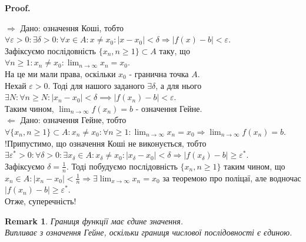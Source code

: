 \documentclass[a4paper, 14pt]{article}
\makeatletter
\def\qed{$\blacksquare$}
\def\rightproof{$\boxed{\Rightarrow}$ }
\def\leftproof{$\boxed{\Leftarrow}$ }
\theoremstyle{theoremdd}
\theoremstyle{theoremdd}
\theoremstyle{theoremdd}
\theoremstyle{theoremdd}
\theoremstyle{theoremdd}
\theoremstyle{theoremdd}
\newtheorem{remark}[theorem]{Remark}
\theoremstyle{theoremdd}
\theoremstyle{theoremdd}
\renewenvironment{proof}[1][Proof.\\]{\par
\pushQED{\hfill \qed}%
\normalfont \topsep6\p@\@plus6\p@\relax
\trivlist
\item\relax
{\bfseries
#1\@addpunct{.}}\hspace\labelsep\ignorespaces
}{%
\popQED\endtrivlist\@endpefalse
}
\makeatother
\begin{document}
	\begin{proof}
	\rightproof Дано: означення Коші, тобто\\
	$\forall \varepsilon > 0: \exists \delta > 0: \forall x \in A: x \neq x_0: |x-x_0|<\delta \Rightarrow |f(x)-b|<\varepsilon$.\\
	Зафіксуємо послідовність $\{x_n, n \geq 1\} \subset A$ таку, що $\forall n \geq 1: x_n \neq x_0: \displaystyle \lim_{n \to \infty} x_n = x_0$.\\
	На це ми мали права, оскільки $x_0$ - гранична точка $A$.\\
	Нехай $\varepsilon > 0$. Тоді для нашого заданого $\exists \delta$, а для нього $\exists N: \forall n \geq N: |x_n - x_0| < \delta \implies |f(x_n) - b| < \varepsilon$.\\
	Таким чином, $\displaystyle \lim_{n \to \infty} f(x_n) = b$ - означення Гейне.
	\bigskip \\
	\leftproof Дано: означення Гейне, тобто\\
	$\displaystyle \forall \{x_n, n \geq 1\}\subset A: x_n \neq x_0: \forall n \geq 1: \lim_{n \to \infty} x_n = x_0 \Rightarrow \lim_{n \to \infty} f(x_n) = b$.\\
	!Припустимо, що означення Коші не виконується, тобто\\
	$\exists \varepsilon^*>0: \forall \delta > 0: \exists x_{\delta} \in A: x_{\delta} \neq x_{0}: |x_{\delta} - x_0| < \delta \Rightarrow |f(x_{\delta}) - b| \geq \varepsilon^*$.\\
	Зафіксуємо $\delta = \displaystyle \frac{1}{n}$. Тоді побудуємо послідовність $\{x_n, n \geq 1\}$ таким чином, що \\ $x_n \in A: |x_n-x_0| < \displaystyle \frac{1}{n} \Rightarrow \exists \lim_{x \to \infty} x_n = x_0$ за теоремою про поліцаї, але водночас $|f(x_n) - b| \geq \varepsilon^*$.\\
	Отже, суперечність!
	\end{proof}
	
	\begin{remark}
	Границя функції має єдине значення.\\
	\textit{Випливає з означення Гейне, оскільки границя числової послідовності є єдиною.}
	\end{remark}
	
\end{document}
